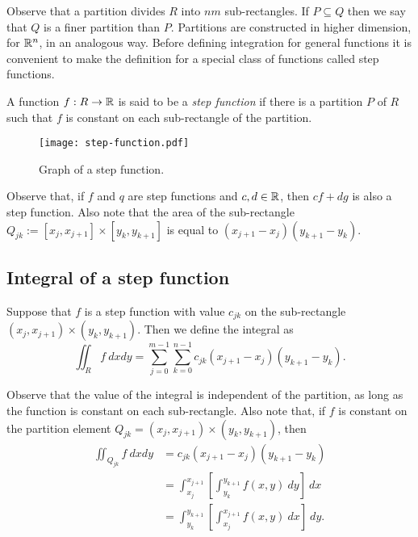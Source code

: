 Observe that a partition divides \(R\) into \(nm\) sub-rectangles.
If \(P \subseteq Q\) then we say that \(Q\) is a finer partition than \(P\).
Partitions are constructed in higher dimension, for \(\mathbb{R}^n\), in an analogous way.
Before defining integration for general functions it is convenient to make the definition for a special class of functions called step functions.

\begin{definition}
    A function \(f:R\to \mathbb{R} \) is said to be a \emph{step function} if there is a partition \(P\) of \(R\) such that \(f\) is constant on each sub-rectangle of the partition.
\end{definition}

\begin{figure}
    \centering
    \texttt{[image: step-function.pdf]}
    \caption{Graph of a step function.}
\end{figure}

Observe that, if \(f\) and \(q\) are step functions and  \(c,d \in \mathbb{R}\), then \(c f + d g\) is also a step function.
Also note that the area of the sub-rectangle \(Q_{jk}:=[x_{j},x_{j+1}]\times [y_{k},y_{k+1}]\) is equal to \( (x_{j+1}-x_{j})(y_{k+1}-y_{k})\).

\subsection{Integral of a step function}

\begin{definition}
    Suppose that \(f\) is a step function with value \(c_{jk}\) on the sub-rectangle \((x_{j},x_{j+1})\times (y_{k},y_{k+1})\).
    Then we define the integral as
    \[
        \iint_{R} f \ dxdy = \sum_{j=0}^{m-1} \sum_{k=0}^{n-1} c_{jk} (x_{j+1}-x_{j})(y_{k+1}-y_{k}).
    \]
\end{definition}

Observe that the value of the integral is independent of the partition, as long as the function is constant on each sub-rectangle.
Also note that, if \(f\) is constant on the partition element \(Q_{jk} = (x_{j},x_{j+1})\times (y_{k},y_{k+1})\), then
\[
    \begin{aligned}
        \iint_{Q_{jk}} f \ dxdy
         & = c_{jk} (x_{j+1}-x_{j})(y_{k+1}-y_{k})                                       \\
         & = \int_{x_j}^{x_{j+1}} \left[\int_{y_k}^{y_{k+1}}f(x,y) \ dy\right] \ dx      \\
         & =  \int_{y_k}^{y_{k+1}} \left[ \int_{x_j}^{x_{j+1}} f(x,y) \ dx \right] \ dy.
    \end{aligned}
\]

